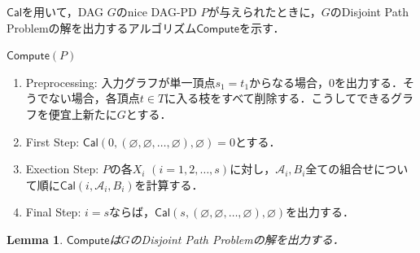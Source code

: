 \documentclass[master]{kuisthesis}		%
\theoremstyle{plain}
\newtheorem{lemma}{Lemma}
\theoremstyle{definition}
\begin{document}
$\mathsf{Cal}$を用いて，DAG $G$のnice DAG-PD $P$が与えられたときに，$G$のDisjoint Path Problemの解を出力するアルゴリズム$\mathsf{Compute}$を示す．


$\mathsf{Compute}(P)$

\begin{enumerate}
    \item Preprocessing: 入力グラフが単一頂点$s_1=t_1$からなる場合，0を出力する．そうでない場合，各頂点$t \in T$に入る枝をすべて削除する．こうしてできるグラフを便宜上新たに$G$とする．
    \item First Step: $\mathsf{Cal}(0, (\varnothing, \varnothing, \dots, \varnothing), \varnothing) = 0$とする．
    \item Exection Step: $P$の各$X_i$ $(i=1, 2, \dots, s)$に対し，$\mathscr{A}_i, B_i$全ての組合せについて順に$\mathsf{Cal}(i, \mathscr{A}_i, B_i)$を計算する．
    \item Final Step: $i = s$ならば，$\mathsf{Cal}(s, (\varnothing, \varnothing, \dots, \varnothing), \varnothing)$を出力する．
\end{enumerate}


\begin{lemma}\label{dpp}
    $\mathsf{Compute}$は$G$のDisjoint Path Problemの解を出力する．
\end{lemma}
\end{document}
